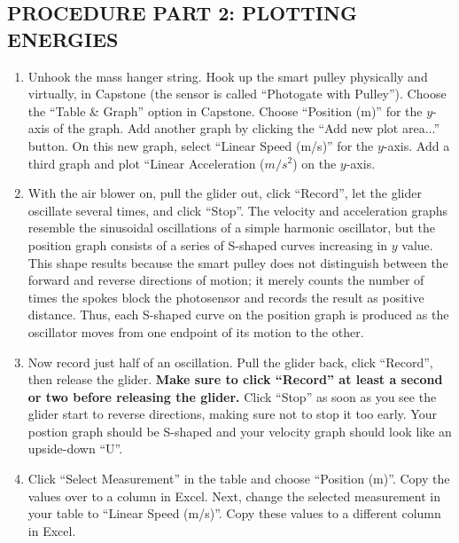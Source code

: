 \begin{enumerate}[label=\arabic*.]
\end{enumerate}

\subsection*{PROCEDURE PART 2: PLOTTING ENERGIES}

\begin{enumerate}[label=\arabic*.]

\item Unhook the mass hanger string. Hook up the smart pulley physically and virtually, in Capstone (the sensor is called ``Photogate with Pulley'').  Choose the ``Table \& Graph'' option in Capstone.  Choose ``Position (m)'' for the \(y\)-axis of the graph.  Add another graph by clicking the ``Add new plot area...'' button.  On this new graph, select ``Linear Speed (m/s)'' for the \(y\)-axis.  Add a third graph and plot ``Linear Acceleration ($m/s^2$) on the \(y\)-axis.

\item With the air blower on, pull the glider out, click ``Record'', let the glider oscillate several times, and click ``Stop''.  The velocity and acceleration graphs resemble the sinusoidal oscillations of a simple harmonic oscillator, but the position graph consists of a series of S-shaped curves increasing in \(y\) value.  This shape results because the smart pulley does not distinguish between the forward and reverse directions of motion; it merely counts the number of times the spokes block the photosensor and records the result as positive distance.  Thus, each S-shaped curve on the position graph is produced as the oscillator moves from one endpoint of its motion to the other.

\item Now record just half of an oscillation.  Pull the glider back, click ``Record'', then release the glider.  
\textbf{Make sure to click ``Record'' at least a second or two before releasing the glider.}
Click ``Stop'' as soon as you see the glider start to reverse directions, making sure not to stop it too early.  Your postion graph should be S-shaped and your velocity graph should look like an upside-down ``U''.

\item Click ``Select Measurement'' in the table and choose ``Position (m)''.  
Copy the values over to a column in Excel.  Next, change the selected measurement in your table to ``Linear Speed (m/s)''.  Copy these values to a different column in Excel.


\end{enumerate}
